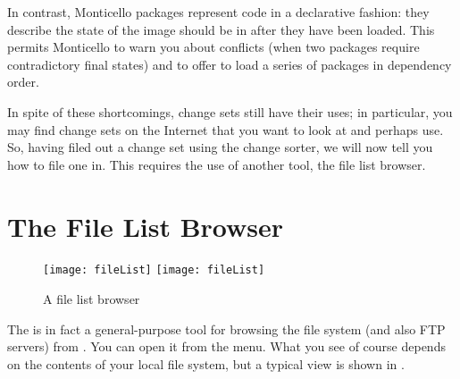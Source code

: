\documentclass[a4paper,10pt,twoside]{book}
\begin{document}
In contrast, Monticello packages represent code in a declarative fashion: they describe the state of the image should be in after they have been loaded.
This permits Monticello to warn you about conflicts (when two packages require contradictory final states)
and to offer to load a series of packages in dependency order.

In spite of these shortcomings, change sets still have their uses; in particular, you may find change sets on the Internet that you want to look at and perhaps use.
So, having filed out a change set using the change sorter, we will now tell you how to file one in.
This requires the use of another tool, the file list browser.


\section{The File List Browser}

\begin{figure}[btp]
	\begin{center}
	\ifluluelse
		{\texttt{[image: fileList]}}
		{\texttt{[image: fileList]}}
	\end{center}
	\caption{A file list browser}
\end{figure}

The  is in fact a general-purpose tool for browsing the file system (and also FTP servers) from \pharo. 
You can open it from the  menu.
What you see of course depends on the contents of your local file system, but a typical view is shown in .
\end{document}
